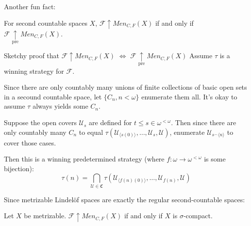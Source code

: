 \documentclass{beamer}
\theoremstyle{definition}
\newcommand{\win}{\uparrow}
\newcommand{\prewin}{\underset{\text{pre}}{\uparrow}}
\newcommand{\menGame}[1]{Men_{C,F}\left({#1}\right)}
\newcommand{\concat}{{^\frown}}
\newcommand{\<}{\langle}
\renewcommand{\>}{\rangle}
\newcommand{\mc}[1]{\mathcal{#1}}
\newcommand{\pl}[1]{\mathscr{#1}}
\begin{document}
\begin{frame}
  Another fun fact:
  \begin{theorem}[C]
    For second countable spaces \(X\), \(\pl F \win \menGame X\) if and only if
    \(\pl F \prewin\menGame X\).
  \end{theorem}
\end{frame}

\begin{frame}{
  Sketchy proof that \(\pl F\win\menGame X\) \(\Leftrightarrow\)
  \(\pl F\prewin\menGame X\)
}\small
  Assume \(\tau\) is a winning strategy for \(\pl F\).

  \vpause

  Since there are only countably many unions of finite collections of basic open
  sets in a secound countable space, let \(\{C_n,n<\omega\}\) enumerate them
  all. It's okay to assume \(\tau\) always yields some \(C_n\).

  \vpause

  Suppose the open covers \(\mc U_s\) are defined for
  \(t\leq s\in\omega^{<\omega}\).
  Then since there are only countably many \(C_n\) to equal
  \(\tau(\mc U_{\<s(0)\>},\dots,\mc U_s,\mc U)\), enumerate
  \(\mc U_{s\concat\<n\>}\) to cover those cases.

  \vpause

  Then this is a winning predetermined strategy
  (where \(f:\omega\to\omega^{<\omega}\) is some bijection):
  \[
    \tau(n)
      =
    \bigcap_{\mc U\in \mathfrak C}
    \tau(\mc U_{\<f(n)(0)\>},\dots,\mc U_{f(n)},\mc U)
  \]
\end{frame}

\begin{frame}
  Since metrizable Lindel\"of spaces are exactly the regular second-countable
  spaces:

  \begin{corollary}
    Let \(X\) be metrizable. \(\pl F\win\menGame X\) if and only if \(X\) is
    \(\sigma\)-compact.
  \end{corollary}
\end{frame}



\end{document}
